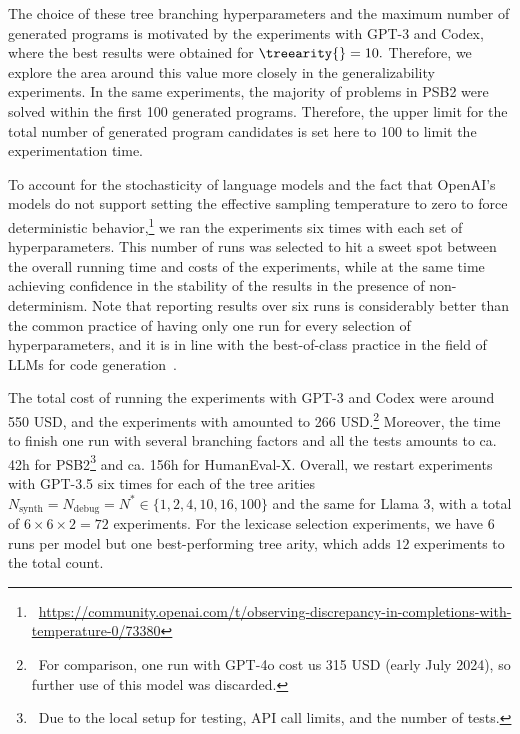 The choice of these tree branching hyperparameters and the maximum number of generated programs is motivated by the experiments with GPT-3 and Codex, where the best results were obtained for $\treearity{}=10.$ 
Therefore, we explore the area around this value more closely in the generalizability experiments.
In the same experiments, the majority of problems in PSB2 were solved within the first 100 generated programs.
Therefore, the upper limit for the total number of generated program candidates is set here to 100 to limit the experimentation time.

To account for the stochasticity of language models and the fact that OpenAI's models do not support setting the effective sampling temperature to zero to force deterministic behavior,\footnote{~\url{https://community.openai.com/t/observing-discrepancy-in-completions-with-temperature-0/73380}} we ran the experiments six times with each set of hyperparameters.
This number of runs was selected to hit a sweet spot between the overall running time and costs of the experiments, while at the same time achieving confidence in the stability of the results in the presence of non-determinism. 
Note that reporting results over six runs is considerably better than the common practice of having only one run for every selection of hyperparameters, and it is in line with the best-of-class practice in the field of LLMs for code generation~\cite{ouyang2023:llm}.

The total cost of running the experiments with GPT-3 and Codex were around 550 USD, and the experiments with \gpt{} amounted to 266 USD.\footnote{~For comparison, one run with GPT-4o cost us 315 USD (early July 2024), so further use of this model was discarded.}
Moreover, the time to finish one run with several branching factors and all the tests amounts to ca. 42h for PSB2\footnote{~Due to the local setup for testing, API call limits, and the number of tests.} and ca. 156h for HumanEval-X.
Overall, we restart experiments with GPT-3.5 six times for each of the tree arities $ N_{\text{synth}} = N_{\text{debug}} = N^* \in \{1,2, 4,10,16,100\}$ and the same for Llama 3, with a total of $6 \times 6 \times 2 = 72$ experiments. 
For the lexicase selection experiments, we have 6 runs per model but one best-performing tree arity, which adds $12$ experiments to the total count.

